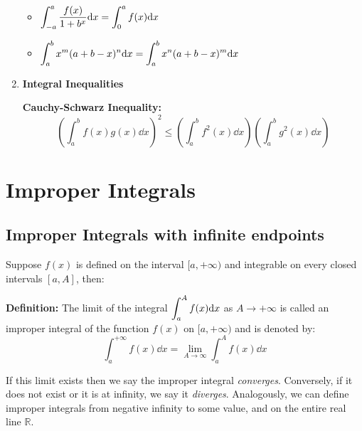 \documentclass[12pt]{article}
\begin{document}
\begin{enumerate}
\begin{itemize}
        \item $\mathlarger{\int_{-a}^a \dfrac{f(x)}{1+b^x}\dd x = \int_0^a f(x) \dd x}$
        \item $\mathlarger{\int_a^b x^m (a+b-x)^n \dd x  = \int_a^b x^n (a+b-x)^m \dd x}$
    \end{itemize}
    \item \textbf{Integral Inequalities}
    \begin{important}
        \textbf{Cauchy-Schwarz Inequality:}
        \begin{equation*}
            \left( \int_a^b f(x) g(x) \dd x \right)^2 \leq \left( \int_a^b f^2(x) \dd x \right)\left( \int_a^b g^2(x) \dd x \right)
        \end{equation*}
    \end{important}
\end{enumerate}
\section{Improper Integrals}
\subsection{Improper Integrals with infinite endpoints}
\par Suppose $f(x)$ is defined on the interval $[a,+\infty)$ and integrable on every closed intervals $[a,A]$, then:
\begin{concept}
    \textbf{Definition:} The limit of the integral $\mathlarger{\int_a^A f(x) \dd x}$ as $A \rightarrow +\infty$ is called an improper integral of the function $f(x)$ on $[a,+\infty)$ and is denoted by:
    \begin{equation*}
        \int_a^{+\infty} f(x) \dd x = \lim_{A \rightarrow \infty} \int_a^A f(x) \dd x
    \end{equation*}
\end{concept}
If this limit exists then we say the improper integral \emph{converges}. Conversely, if it does not exist or it is at infinity, we say it \emph{diverges}. Analogously, we can define improper integrals from negative infinity to some value, and on the entire real line $\mathbb{R}$.
\end{document}
